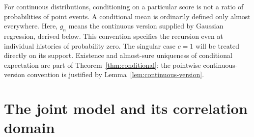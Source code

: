 For continuous distributions, conditioning on a particular score is not a
ratio of probabilities of point events. A conditional mean is ordinarily
defined only almost everywhere. Here, \(g_n\) means the continuous version
supplied by Gaussian regression, derived below. This convention specifies
the recursion even at individual histories of probability zero. The singular
case \(c=1\) will be treated directly on its support.
Existence and almost-sure uniqueness of conditional expectation are part of
Theorem~\ref{thm:conditional}; the pointwise continuous-version convention
is justified by Lemma~\ref{lem:continuous-version}.



\chapter{The joint model and its correlation domain}

